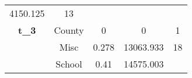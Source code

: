 \documentclass[]{book}
\theoremstyle{definition}
\theoremstyle{definition}
\theoremstyle{definition}
\theoremstyle{remark}
\begin{document}
\begin{longtable}[]{@{}ccccc@{}}
\begin{minipage}[t]{0.14\columnwidth}
4150.125\strut
\end{minipage} & \begin{minipage}[t]{0.14\columnwidth}\centering\strut
13\strut
\end{minipage}\tabularnewline
\begin{minipage}[t]{0.12\columnwidth}\centering\strut
\textbf{t\_3}\strut
\end{minipage} & \begin{minipage}[t]{0.12\columnwidth}\centering\strut
County\strut
\end{minipage} & \begin{minipage}[t]{0.11\columnwidth}\centering\strut
0\strut
\end{minipage} & \begin{minipage}[t]{0.14\columnwidth}\centering\strut
0\strut
\end{minipage} & \begin{minipage}[t]{0.14\columnwidth}\centering\strut
1\strut
\end{minipage}\tabularnewline
\begin{minipage}[t]{0.12\columnwidth}\centering\strut
\strut
\end{minipage} & \begin{minipage}[t]{0.12\columnwidth}\centering\strut
Misc\strut
\end{minipage} & \begin{minipage}[t]{0.11\columnwidth}\centering\strut
0.278\strut
\end{minipage} & \begin{minipage}[t]{0.14\columnwidth}\centering\strut
13063.933\strut
\end{minipage} & \begin{minipage}[t]{0.14\columnwidth}\centering\strut
18\strut
\end{minipage}\tabularnewline
\begin{minipage}[t]{0.12\columnwidth}\centering\strut
\strut
\end{minipage} & \begin{minipage}[t]{0.12\columnwidth}\centering\strut
School\strut
\end{minipage} & \begin{minipage}[t]{0.11\columnwidth}\centering\strut
0.41\strut
\end{minipage} & \begin{minipage}[t]{0.14\columnwidth}\centering\strut
14575.003\strut
\end{minipage} & \begin{minipage}[t]{0.14\columnwidth}\centering\strut

\end{minipage}
\end{longtable}
\end{document}
